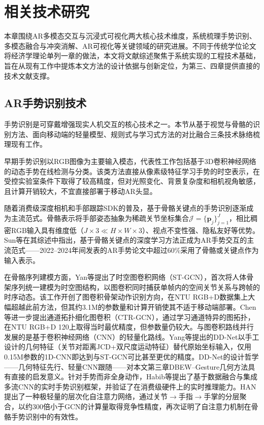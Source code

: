 \chapter{相关技术研究}
\label{ch:theory}

本章围绕AR多模态交互与沉浸式可视化两大核心技术维度，系统梳理手势识别、多模态融合与冲突消解、AR可视化等关键领域的研究进展。不同于传统学位论文将经济学理论单列一章的做法，本文将文献综述聚焦于系统实现的工程技术基础，旨在从现有工作中提炼本文方法的设计依据与创新定位，为第三、四章提供直接的技术文献支撑。

\section{AR手势识别技术}
\label{sec:ch2_gesture_survey}

手势识别是可穿戴增强现实人机交互的核心技术之一。本节从基于视觉与骨骼的识别方法、面向移动端的轻量模型、规则式与学习式方法的对比融合三条技术脉络梳理现有工作。


早期手势识别以RGB图像为主要输入模态，代表性工作包括基于3D卷积神经网络的动态手势在线检测与分类\cite{molchanov2016online_gesture}。该类方法直接从像素级特征学习手势的时空表示，在受控实验室条件下取得了较高精度，但对光照变化、背景复杂度和相机视角敏感，且计算开销较大，不宜直接部署于移动AR头显。

随着消费级深度相机和手部跟踪SDK的普及，基于骨骼关键点的手势识别逐渐成为主流范式。骨骼表示将手部姿态抽象为稀疏关节坐标集合$\mathcal{J}=\{\mathbf{p}_j\}_{j=1}^{J}$，相比稠密RGB输入具有维度低（$J\times3\ll H\times W\times3$）、视点不变性强、隐私友好等优势。Sun等\cite{sun2024ar_gesture_survey}在其综述中指出，基于骨骼关键点的深度学习方法正成为AR手势交互的主流范式——2022--2024年间发表的AR手势论文中超过60\%采用了骨骼或关键点作为输入表示。

在骨骼序列建模方面，Yan等\cite{yan2018stgcn}提出了时空图卷积网络（ST-GCN），首次将人体骨架序列统一建模为时空图结构，以图卷积同时捕获单帧内的空间关节关系与跨帧的时序动态。该工作开创了图卷积骨架动作识别方向，在NTU RGB+D数据集上大幅超越此前方法，但其约3.1M的参数量和计算开销使其不适于移动端部署。Chen等\cite{chen2021ctrgcn}进一步提出通道拓扑细化图卷积（CTR-GCN），通过学习通道特异的图拓扑，在NTU RGB+D 120上取得当时最优精度，但参数量仍较大。与图卷积路线并行发展的是基于卷积神经网络（CNN）的轻量化路线。Yang等\cite{yang2019ddnet}提出的DD-Net以手工设计的几何特征（关节对距离JCD+双尺度运动特征）替代原始坐标输入，仅用0.15M参数的1D-CNN即达到与ST-GCN可比甚至更优的精度。DD-Net的设计哲学——几何特征先行、轻量CNN跟随——对本文第三章DBEW--Gesture几何方法具有直接的启发意义。针对手势而非全身动作，Habib等\cite{habib2025skeleton_hgr}提出了基于数据融合与集成多流CNN的实时手势识别框架，并验证了在消费级硬件上的实时推理能力。HAN\cite{han2025hierarchical_attention}提出了一种极轻量的层次化自注意力网络，通过关节$\rightarrow$手指$\rightarrow$手掌的分层聚合，以约300倍小于GCN的计算量取得竞争性精度，再次证明了自注意力机制在骨骼手势识别中的有效性。

